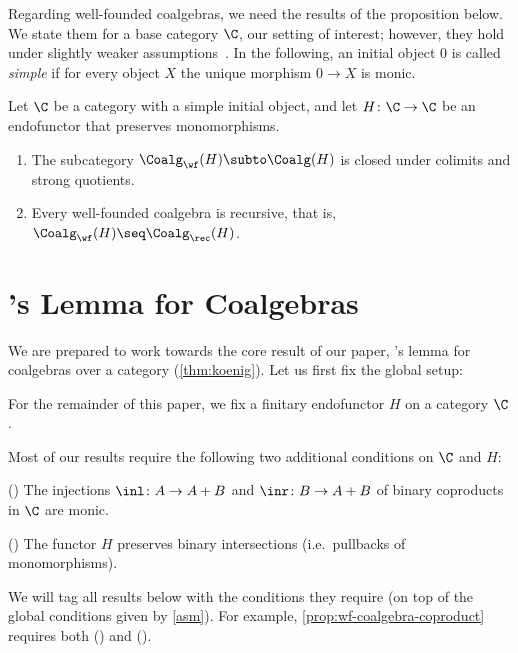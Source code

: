 Regarding well-founded coalgebras, we need the results of the proposition below. We state them for a \lfp base category $\C$, our setting of interest; however, they hold under slightly weaker assumptions~\cite[Cor.~8.4.3, Thm.~8.5.3]{amm25}. In the following, an initial object $0$ is called \emph{simple} if for every object $X$ the unique morphism $0\to X$ is monic.


\begin{proposition}\label{prop:wf} 
Let $\C$ be a \lfp category with a simple initial object, and let $H\colon \C\to \C$ be an endofunctor that preserves monomorphisms.
\begin{enumerate}
\item\label{prop:wf:closed-colim-quotients} The subcategory $\Coalg_\wf(H)\subto \Coalg(H)$ is closed under colimits and strong quotients.
\item\label{prop:wf:wf-to-rec} Every well-founded coalgebra is recursive, that is, $\Coalg_\wf(H)\seq \Coalg_\rec(H)$.
\end{enumerate}
\end{proposition}








\section{\Konig's Lemma for Coalgebras}\label{sec:konig}
We are prepared to work towards the core result of our paper, \Konig's lemma for coalgebras over a \lfp category (\autoref{thm:koenig}). Let us first fix the global setup:

\begin{assumption}\label{asm}
For the remainder of this paper, we fix a finitary endofunctor $H$ on a \lfplong category $\C$. 
\end{assumption}
Most of our results require the following two additional conditions on $\C$ and $H$:

\medskip\noindent (\injmono) The injections $\inl\colon A\to A+B$ and $\inr\colon B\to A+B$ of binary coproducts in $\C$ are monic.

\medskip\noindent (\hpresint) The functor $H$ preserves binary intersections (i.e.\ pullbacks of monomorphisms).

\medskip\noindent We will tag all results below with the conditions they require (on top of the global conditions given by \autoref{asm}). For example, \autoref{prop:wf-coalgebra-coproduct} requires both (\injmono) and (\hpresint).

